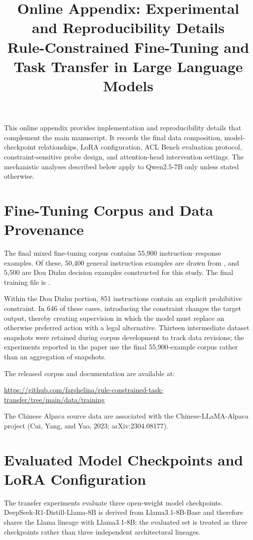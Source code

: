 \documentclass[11pt]{article}
\title{Online Appendix: Experimental and Reproducibility Details\\
\large Rule-Constrained Fine-Tuning and Task Transfer in Large Language Models}
\author{}
\date{}
\begin{document}
\maketitle

This online appendix provides implementation and reproducibility details that complement the main manuscript. It records the final data composition, model-checkpoint relationships, LoRA configuration, ACL Bench evaluation protocol, constraint-sensitive probe design, and attention-head intervention settings. The mechanistic analyses described below apply to Qwen2.5-7B only unless stated otherwise.

\section{Fine-Tuning Corpus and Data Provenance}

The final mixed fine-tuning corpus contains 55,900 instruction--response examples. Of these, 50,400 general instruction examples are drawn from , and 5,500 are Dou Dizhu decision examples constructed for this study. The final training file is .

Within the Dou Dizhu portion, 851 instructions contain an explicit prohibitive constraint. In 646 of these cases, introducing the constraint changes the target output, thereby creating supervision in which the model must replace an otherwise preferred action with a legal alternative. Thirteen intermediate dataset snapshots were retained during corpus development to track data revisions; the experiments reported in the paper use the final 55,900-example corpus rather than an aggregation of snapshots.

The released corpus and documentation are available at:
\begin{center}
\url{https://github.com/farshelina/rule-constrained-task-transfer/tree/main/data/training}
\end{center}
The Chinese Alpaca source data are associated with the Chinese-LLaMA-Alpaca project (Cui, Yang, and Yao, 2023; arXiv:2304.08177).

\section{Evaluated Model Checkpoints and LoRA Configuration}

The transfer experiments evaluate three open-weight model checkpoints. DeepSeek-R1-Distill-Llama-8B is derived from Llama3.1-8B-Base and therefore shares the Llama lineage with Llama3.1-8B; the evaluated set is treated as three checkpoints rather than three independent architectural lineages.
\end{document}
